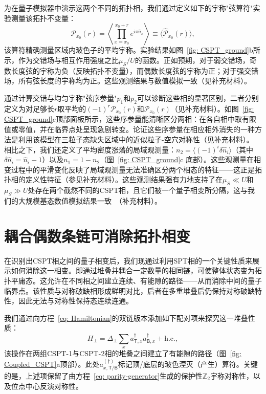 \documentclass[preprint,superscriptaddress,floatfix,nofootinbib]{revtex4-2}
\begin{document}
为在量子模拟器中演示这两个不同的拓扑相，我们通过定义如下的宇称"弦算符"实验测量\cite{Hilker17, Wei23}该拓扑不变量：
\begin{equation}
\label{eq: POP}
\mathcal{P}_{x_0}(r) =  \left\langle \prod_{x=x_0}^{x_0+r} e^{i\pi \hat n_x}\right\rangle \equiv \langle \hat{\mathcal{P}}_{x_0}(r) \rangle,
\end{equation}
该算符精确测量区域内玻色子的平均宇称。实验结果如图~\ref{fig: CSPT_ground}b所示，作为交错场与相互作用强度之比$\mu_S/U$的函数。正如预期，对于弱交错场，奇数长度弦的宇称为负（反映拓扑不变量），而偶数长度弦的宇称为正；对于强交错场，所有弦长度的宇称均为正。这些观测结果与数值模拟一致（见补充材料）。

通过计算交错与均匀宇称"弦序参量"$p_1$和$p_2$可以诊断这些相的显著区别，二者分别定义为对足够长$r$取平均的$(-1)^{r} \mathcal{P}_{x_0}(r)$和$\mathcal{P}_{x_0}(r)$（见补充材料）。如图~\ref{fig: CSPT_ground}c顶部面板所示，这些序参量能清晰区分两相：在各自相中取有限值或零值，并在临界点处呈现急剧转变。论证这些序参量在相应相外消失的一种方法是利用该模型在三粒子态缺失区域中的近似粒子-空穴对称性（见补充材料）。
相比之下，我们还定义了平均密度涨落的局域观测量：$n_2= \langle (-1)^i\delta\hat{n}_i\rangle $（其中$\delta \hat{n}_i=\hat{n}_i-1$）以及$n_1= 1 - n_2$（图~\ref{fig: CSPT_ground}c 底部）。这些观测量在相变过程中的平滑变化反映了局域观测量无法准确区分两个相态的特征——这正是拓扑相的定义性特征（参见补充材料）。这些观测结果强有力地支持了在$\mu_S \ll U$和$\mu_S \gg U$处存在两个截然不同的CSPT相，且它们被一个量子相变所分隔，这与我们的大规模基态数值模拟结果一致~\cite{Sahay2025}（补充材料）。
\section{耦合偶数条链可消除拓扑相变}

在识别出CSPT相之间的量子相变后，我们现通过利用SPT相的一个关键性质来展示如何消除这一相变。即通过堆叠并耦合一定数量的相同链，可使整体状态变为拓扑平庸态\cite{Turner11, Fidkowski11, Pollmann2012, Schuch2011, Chen2011, Chen2012}。这允许在不同相之间建立连续、有能隙的路径——从而消除中间的量子临界点。该性质与对称破缺相形成鲜明对比，后者在多重堆叠后仍保持对称破缺特性，因此无法与对称性保持态连续连通。

我们通过向方程~\eqref{eq: Hamiltonian}的双链版本添加如下配对项来探究这一堆叠性质：
\begin{equation}
    H_{\perp} = \Delta_{\perp} \sum_{x} a^{\dagger}_{\mathsf{T}, x} a^{\dagger}_{\mathsf{B}, x}   + \text{h.c.},
\label{eq: coupling}
\end{equation}
该操作在两组CSPT-1与CSPT-2相的堆叠之间建立了有能隙的路径（图~\ref{fig: Coupled_CSPT}a顶部）。此处$a_{x, \mathsf{T}/\mathsf{B}}^{(\dagger)}$标记顶/底层的玻色湮灭（产生）算符。关键的是，上述项保留了由方程~\eqref{eq: parity-generator}生成的保护性$\mathbb{Z}_2$宇称对称性，以及位点中心反演对称性。
\end{document}
